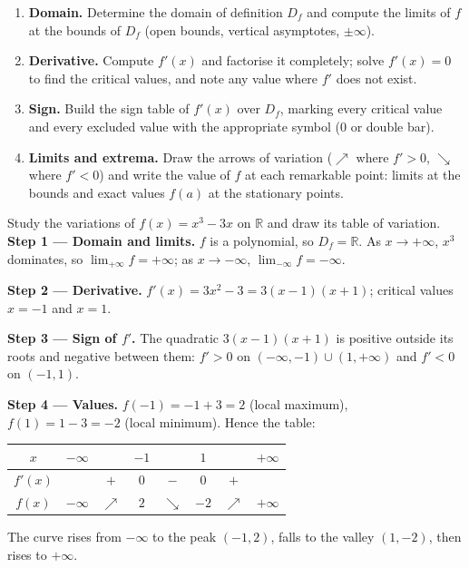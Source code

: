 \documentclass[11pt]{article}
\begin{document}
\begin{methode}
\begin{enumerate}
\item \textbf{Domain.} Determine the domain of definition $D_f$ and compute the limits of $f$ at the bounds of $D_f$ (open bounds, vertical asymptotes, $\pm\infty$).
\item \textbf{Derivative.} Compute $f'(x)$ and factorise it completely; solve $f'(x)=0$ to find the critical values, and note any value where $f'$ does not exist.
\item \textbf{Sign.} Build the sign table of $f'(x)$ over $D_f$, marking every critical value and every excluded value with the appropriate symbol ($0$ or double bar).
\item \textbf{Limits and extrema.} Draw the arrows of variation ($\nearrow$ where $f'>0$, $\searrow$ where $f'<0$) and write the value of $f$ at each remarkable point: limits at the bounds and exact values $f(a)$ at the stationary points.
\end{enumerate}
\end{methode}

\begin{exoresolu}[Complete study of $f(x)=x^3-3x$]
Study the variations of $f(x)=x^3-3x$ on $\mathbb{R}$ and draw its table of variation.
\tcblower
\textbf{Step 1 — Domain and limits.} $f$ is a polynomial, so $D_f=\mathbb{R}$. As $x\to+\infty$, $x^3$ dominates, so $\lim_{+\infty}f=+\infty$; as $x\to-\infty$, $\lim_{-\infty}f=-\infty$.

\textbf{Step 2 — Derivative.} $f'(x)=3x^2-3=3(x-1)(x+1)$; critical values $x=-1$ and $x=1$.

\textbf{Step 3 — Sign of $f'$.} The quadratic $3(x-1)(x+1)$ is positive outside its roots and negative between them: $f'>0$ on $(-\infty,-1)\cup(1,+\infty)$ and $f'<0$ on $(-1,1)$.

\textbf{Step 4 — Values.} $f(-1)=-1+3=2$ (local maximum), $f(1)=1-3=-2$ (local minimum). Hence the table:

\begin{center}
\begin{tabular}{|c|ccccccc|}
\hline
$x$ & $-\infty$ & & $-1$ & & $1$ & & $+\infty$ \\
\hline
$f'(x)$ & & $+$ & $0$ & $-$ & $0$ & $+$ & \\
\hline
$f(x)$ & $-\infty$ & $\nearrow$ & $2$ & $\searrow$ & $-2$ & $\nearrow$ & $+\infty$ \\
\hline
\end{tabular}
\end{center}

The curve rises from $-\infty$ to the peak $(-1,2)$, falls to the valley $(1,-2)$, then rises to $+\infty$.
\end{exoresolu}
\end{document}
